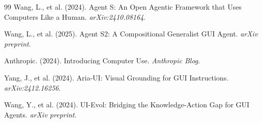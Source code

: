 \documentclass[11pt]{article}
\begin{document}
\begin{thebibliography}{99}
Wang, L., et al. (2024).
Agent S: An Open Agentic Framework that Uses Computers Like a Human.
\textit{arXiv:2410.08164}.

Wang, L., et al. (2025).
Agent S2: A Compositional Generalist GUI Agent.
\textit{arXiv preprint}.

Anthropic. (2024).
Introducing Computer Use.
\textit{Anthropic Blog}.

Yang, J., et al. (2024).
Aria-UI: Visual Grounding for GUI Instructions.
\textit{arXiv:2412.16256}.

Wang, Y., et al. (2024).
UI-Evol: Bridging the Knowledge-Action Gap for GUI Agents.
\textit{arXiv preprint}.

\end{thebibliography}
\end{document}
